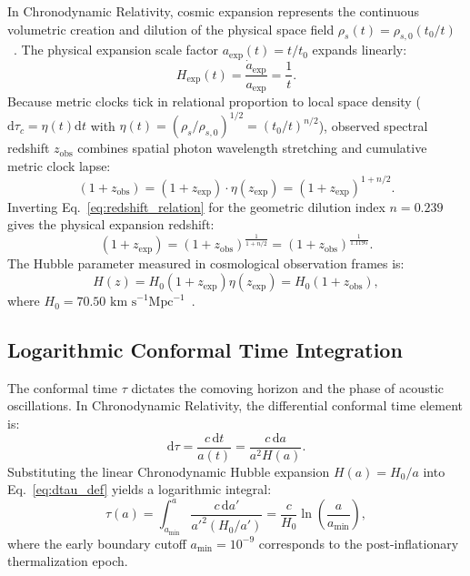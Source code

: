 \documentclass[aps,prd,reprint,superscriptaddress,nofootinbib,twocolumn]{revtex4-2}
\begin{document}
In Chronodynamic Relativity, cosmic expansion represents the continuous volumetric creation and dilution of the physical space field $\rho_s(t) = \rho_{s,0} (t_0/t)$~\cite{Shreve2026_Foundations}. The physical expansion scale factor $a_{\text{exp}}(t) = t/t_0$ expands linearly:
\begin{equation}
\label{eq:linear_expansion}
H_{\text{exp}}(t) = \frac{\dot{a}_{\text{exp}}}{a_{\text{exp}}} = \frac{1}{t}.
\end{equation}
Because metric clocks tick in relational proportion to local space density ($\mathrm{d}\tau_c = \eta(t)\mathrm{d}t$ with $\eta(t) = (\rho_s/\rho_{s,0})^{1/2} = (t_0/t)^{n/2}$), observed spectral redshift $z_{\text{obs}}$ combines spatial photon wavelength stretching and cumulative metric clock lapse:
\begin{equation}
\label{eq:redshift_relation}
(1 + z_{\text{obs}}) = (1 + z_{\text{exp}}) \cdot \eta(z_{\text{exp}}) = (1 + z_{\text{exp}})^{1 + n/2}.
\end{equation}
Inverting Eq.~\eqref{eq:redshift_relation} for the geometric dilution index $n = 0.239$ gives the physical expansion redshift:
\begin{equation}
\label{eq:z_exp_inversion}
(1 + z_{\text{exp}}) = (1 + z_{\text{obs}})^{\frac{1}{1 + n/2}} = (1 + z_{\text{obs}})^{\frac{1}{1.1195}}.
\end{equation}
The Hubble parameter measured in cosmological observation frames is:
\begin{equation}
\label{eq:hubble_obs}
H(z) = H_0 (1 + z_{\text{exp}}) \eta(z_{\text{exp}}) = H_0 (1 + z_{\text{obs}}),
\end{equation}
where $H_0 = 70.50\text{ km s}^{-1}\text{Mpc}^{-1}$~\cite{Shreve2026_Expansion}.

\subsection{Logarithmic Conformal Time Integration}

The conformal time $\tau$ dictates the comoving horizon and the phase of acoustic oscillations. In Chronodynamic Relativity, the differential conformal time element is:
\begin{equation}
\label{eq:dtau_def}
\mathrm{d}\tau = \frac{c\,\mathrm{d}t}{a(t)} = \frac{c\,\mathrm{d}a}{a^2 H(a)}.
\end{equation}
Substituting the linear Chronodynamic Hubble expansion $H(a) = H_0 / a$ into Eq.~\eqref{eq:dtau_def} yields a logarithmic integral:
\begin{equation}
\label{eq:tau_integral}
\tau(a) = \int_{a_{\text{min}}}^a \frac{c\,\mathrm{d}a'}{a'^2 (H_0 / a')} = \frac{c}{H_0} \ln\left(\frac{a}{a_{\text{min}}}\right),
\end{equation}
where the early boundary cutoff $a_{\text{min}} = 10^{-9}$ corresponds to the post-inflationary thermalization epoch. 
\end{document}
